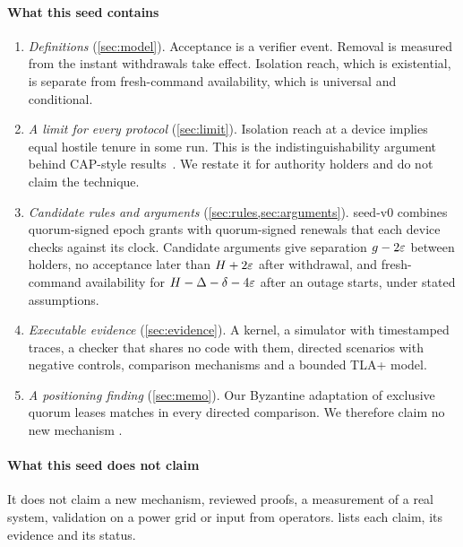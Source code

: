 \paragraph{What this seed contains}
\begin{enumerate}
  \item \emph{Definitions} (\cref{sec:model}). Acceptance is a verifier event. Removal is
  measured from the instant withdrawals take effect. Isolation reach, which is
  existential, is separate from fresh-command availability, which is universal and
  conditional.
  \item \emph{A limit for every protocol} (\cref{sec:limit}). Isolation reach at a
  device implies equal hostile tenure in some run. This is the indistinguishability
  argument behind CAP-style results~\cite{gilbert2002cap}. We restate it for authority
  holders and do not claim the technique.
  \item \emph{Candidate rules and arguments} (\cref{sec:rules,sec:arguments}). \sys{}
  seed-v0 combines quorum-signed epoch grants with quorum-signed renewals that each device
  checks against its clock. Candidate arguments give separation $g - 2\varepsilon$ between
  holders, no acceptance later than $H + 2\varepsilon$ after withdrawal, and fresh-command
  availability for $H - \Delta - \delta - 4\varepsilon$ after an outage starts, under stated
  assumptions.
  \item \emph{Executable evidence} (\cref{sec:evidence}). A kernel, a simulator with
  timestamped traces, a checker that shares no code with them, directed scenarios with
  negative controls, comparison mechanisms and a bounded TLA+ model.
  \item \emph{A positioning finding} (\cref{sec:memo}). Our Byzantine adaptation of
  exclusive quorum leases matches \sys{} in every directed comparison. We therefore
  claim no new mechanism .
\end{enumerate}

\paragraph{What this seed does not claim}
It does not claim a new mechanism, reviewed proofs, a measurement of a real system,
validation on a power grid or input from operators.  lists each claim,
its evidence and its status.

